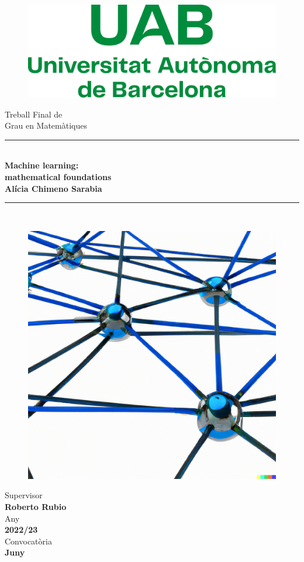 \documentclass[/main.tex]{subfiles}
\begin{document}
	\begin{center}
	    \begin{figure}
	        \centering
	        \includegraphics[width=0.5\linewidth]{imgs/uab.pdf}
	    \end{figure} \mbox{} \par
		\vspace{1cm}
		{\Huge Treball Final de} \\ \bigskip
		{\LARGE Grau en Matemàtiques} \\
		\vfill
        \noindent\rule{\textwidth}{1pt} \\ \bigskip
		{\Huge \bfseries Machine learning:} \\
		{\Huge \bfseries mathematical foundations} \\
		\vspace{1cm}
		{\LARGE \textbf{Alícia Chimeno Sarabia}} \\ \bigskip %
	    \noindent\rule{\textwidth}{1pt} \\ 
	    \vfill
	    
	    	\begin{figure}[h]
	    	\centering
	    	\includegraphics[width=0.5\linewidth]{imgs/dalle.png}
	    \end{figure} \mbox{} \par
	    Supervisor \\ \textbf{Roberto Rubio} \\ \medskip
		Any \\ \textbf{2022/23} \\ \medskip
		Convocatòria \\ \textbf{Juny}
	\end{center}
\end{document}
